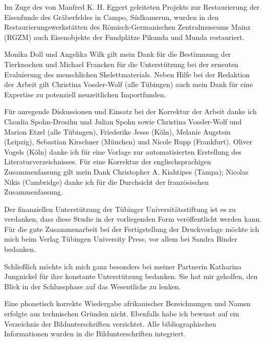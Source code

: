\begin{multicols}{2}
Im Zuge des von Manfred K. H. Eggert geleiteten Projekts zur Restaurierung der Eisenfunde des Gräberfeldes in Campo, Südkamerun, wurden in den Restaurierungswerkstätten des Römisch-Germanischen Zentralmuseums Mainz (RGZM) auch Eisenobjekte der Fundplätze Pikunda und Munda restauriert.

Monika Doll und Angelika Wilk gilt mein Dank für die Bestimmung der Tierknochen und Michael Francken für die Unterstützung bei der erneuten Evaluierung des menschlichen Skelettmaterials. Neben Hilfe bei der Redaktion der Arbeit gilt Christina Vossler-Wolf (alle Tübingen) auch mein Dank für eine Expertise zu potenziell neuzeitlichen Importfunden.

Für anregende Diskussionen und Einsatz bei der Korrektur der Arbeit danke ich Claudia Spohn-Drosihn und Julian Spohn sowie Christina Vossler-Wolf und Marion Etzel (alle Tübingen), Friederike Jesse (Köln), Melanie Augstein (Leipzig), Sebastian Kirschner (München) und Nicole Rupp (Frankfurt). Oliver Vogels (Köln) danke ich für eine Vorlage zur automatisierten Erstellung des Literaturverzeichnisses. Für eine Korrektur der englischsprachigen Zusammenfassung gilt mein Dank Christopher A. \mbox{Kiahtipes} (Tampa); Nicolas Nikis (Cambridge) danke ich für die Durchsicht der französischen Zusammenfassung.

Der finanziellen Unterstützung der Tübinger Universitätsstiftung ist es zu verdanken, dass diese Studie in der vorliegenden Form veröffentlicht werden kann. Für die gute Zusammenarbeit bei der Fertigstellung der Druckvorlage möchte ich mich beim Verlag Tübingen University Press, vor allem bei Sandra Binder bedanken.

Schließlich möchte ich mich ganz besonders bei meiner Partnerin Katharina Jungnickel für ihre konstante Unterstützung bedanken. Sie hat mir geholfen, den Blick in der Schlussphase auf das Wesentliche zu lenken.

Eine phonetisch korrekte Wiedergabe afrikanischer Bezeichnungen und Namen erfolgte aus technischen Gründen nicht. Ebenfalls habe ich bewusst auf ein Verzeichnis der Bildunterschriften verzichtet. Alle bibliographischen Informationen wurden in die Bildunterschriften integriert.

\end{multicols}


\setcounter{secnumdepth}{3}		%
\setcounter{tocdepth}{3}
\tableofcontents
\cleardoublepage

